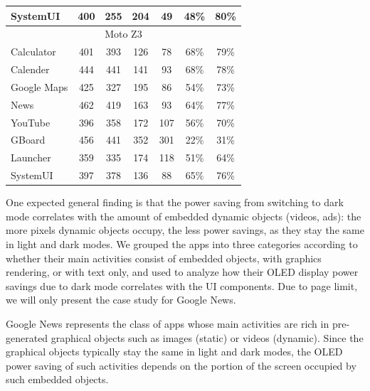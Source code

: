 \begin{table}[tp]
{\begin{tabular}{| l | c | c | c | c |c|c|}
	 SystemUI       &  400 &  255 &  204 &   49 &   48\% &   80\%  \\
	 \hline
         \multicolumn{7}{|c|}{Moto Z3} \\
	 \hline
	 Calculator	&  401 &  393 &  126 &   78 &   68\% &   79\% \\
	 Calender	&  444 &  441 &  141 &   93 &   68\% &   78\% \\
	 Google Maps	&  425 &  327 &  195 &   86 &   54\% &   73\% \\
	 News		&  462 &  419 &  163 &   93 &   64\% &   77\% \\
	 YouTube	&  396 &  358 &  172 &  107 &   56\% &   70\% \\
	 GBoard		&  456 &  441 &  352 &  301 &   22\% &   31\% \\
	 Launcher       &  359 &  335 &  174 &  118 &   51\% &   64\% \\
	 SystemUI       &  397 &  378 &  136 &   88 &   65\% &   76\% \\
	 \hline
\end{tabular}
}
\label{tab:Dark_vs_light_popular_google_apps}
\end{table}
\fi

%
One expected general finding is that
the power saving from switching to dark mode
correlates with the amount of embedded dynamic objects (\eg videos, ads):
the more pixels dynamic objects occupy, the less power savings, as they stay the same
in light and dark modes.
We grouped the apps  into three categories according to
whether their main activities consist of embedded objects, with graphics rendering, or
with text only, and used \name to analyze how 
their OLED display power savings due to dark mode correlates
with the UI components.
\fi
Due to page limit, we will only present the case study for Google News.

Google News
represents the class of apps whose main
activities are rich in pre-generated graphical objects such as images
(static) or videos (dynamic). Since the graphical objects typically
stay the same in light and dark modes, the OLED power saving of
such activities depends on the portion of the screen occupied by such
embedded objects.

